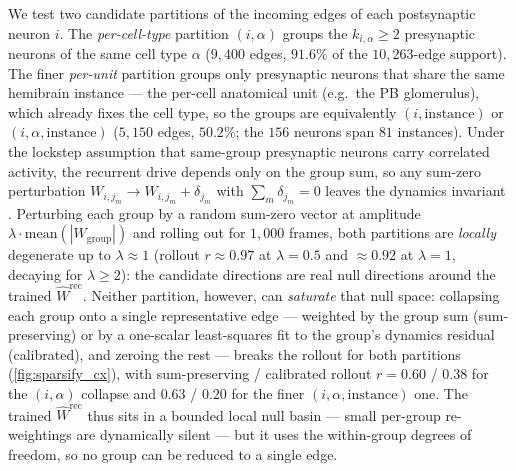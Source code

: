 \documentclass[11pt]{article}
\begin{document}
We test two candidate partitions of the incoming edges of each postsynaptic neuron $i$. The \emph{per-cell-type} partition $(i,\alpha)$ groups the $k_{i,\alpha} \ge 2$ presynaptic neurons of the same cell type $\alpha$ ($9{,}400$ edges, $91.6\%$ of the $10{,}263$-edge support). The finer \emph{per-unit} partition groups only presynaptic neurons that share the same hemibrain instance --- the per-cell anatomical unit (e.g.\ the PB glomerulus), which already fixes the cell type, so the groups are equivalently $(i,\mathrm{instance})$ or $(i,\alpha,\mathrm{instance})$ ($5{,}150$ edges, $50.2\%$; the $156$ neurons span $81$ instances). Under the lockstep assumption that same-group presynaptic neurons carry correlated activity, the recurrent drive depends only on the group sum, so any sum-zero perturbation $W_{i,j_m} \to W_{i,j_m} + \delta_{j_m}$ with $\sum_m \delta_{j_m} = 0$ leaves the dynamics invariant \citep{allier_connectome_2026}. Perturbing each group by a random sum-zero vector at amplitude $\lambda \cdot \mathrm{mean}(|W_{\mathrm{group}}|)$ and rolling out for $1{,}000$ frames, both partitions are \emph{locally} degenerate up to $\lambda \approx 1$ (rollout $r \approx 0.97$ at $\lambda = 0.5$ and $\approx 0.92$ at $\lambda = 1$, decaying for $\lambda \ge 2$): the candidate directions are real null directions around the trained $\hat W^{\mathrm{rec}}$. Neither partition, however, can \emph{saturate} that null space: collapsing each group onto a single representative edge --- weighted by the group sum (sum-preserving) or by a one-scalar least-squares fit to the group's dynamics residual (calibrated), and zeroing the rest --- breaks the rollout for both partitions (\cref{fig:sparsify_cx}), with sum-preserving / calibrated rollout $r = 0.60$ / $0.38$ for the $(i,\alpha)$ collapse and $0.63$ / $0.20$ for the finer $(i,\alpha,\mathrm{instance})$ one. The trained $\hat W^{\mathrm{rec}}$ thus sits in a bounded local null basin --- small per-group re-weightings are dynamically silent --- but it uses the within-group degrees of freedom, so no group can be reduced to a single edge.
\end{document}
